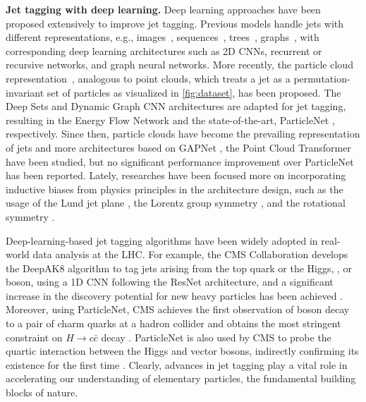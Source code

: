 \documentclass[nohyperref]{article}
\theoremstyle{plain}
\theoremstyle{definition}
\theoremstyle{remark}
\newcommand{\hcc}{\ensuremath{H\to c \bar{c}}\xspace}
\begin{document}
\textbf{Jet tagging with deep learning.}
Deep learning approaches have been proposed extensively to improve jet tagging. Previous models handle jets with different representations, e.g., images~\cite{deOliveira:2015xxd}, sequences~\cite{Guest:2016iqz}, trees~\cite{Louppe:2017ipp}, graphs~\cite{henrionneural}, with corresponding deep learning architectures such as 2D CNNs, recurrent or recursive networks, and graph neural networks. More recently, the particle cloud representation~\cite{Komiske:2018cqr,Qu:2019gqs}, analogous to point clouds, which treats a jet as a permutation-invariant set of particles as visualized in \cref{fig:dataset}, has been proposed. The Deep Sets \cite{NIPS2017_f22e4747} and Dynamic Graph CNN \cite{dgcnn} architectures are adapted for jet tagging, resulting in the Energy Flow Network \cite{Komiske:2018cqr} and the state-of-the-art, ParticleNet \cite{Qu:2019gqs}, respectively. Since then, particle clouds have become the prevailing representation of jets and more architectures based on GAPNet \cite{chen2019gapnet,Mikuni:2020wpr}, the Point Cloud Transformer \cite{guoPCTPointCloud2021,Mikuni:2021pou} have been studied, but no significant performance improvement over ParticleNet has been reported. Lately, researches have been focused more on incorporating inductive biases from physics principles in the architecture design, such as the usage of the Lund jet plane \cite{Dreyer:2018nbf,Dreyer:2020brq,Dreyer:2021hhr,Dreyer:2022yom}, the Lorentz group symmetry \cite{bogatskiy20a,Gong:2022lye}, and the rotational symmetry \cite{Shimmin:2021pkm,Dillon:2021gag}.

Deep-learning-based jet tagging algorithms have been widely adopted in real-world data analysis at the LHC. For example, the CMS Collaboration develops the DeepAK8 \cite{CMS:2020poo} algorithm to tag jets arising from the top quark or the Higgs, , or  boson, using a 1D CNN following the ResNet \cite{heDeepResidualLearning2015} architecture, and a significant increase in the discovery potential for new heavy particles has been achieved \cite{CMS:2021beq,CMS:2022lqh}. Moreover, using ParticleNet, CMS achieves the first observation of  boson decay to a pair of charm quarks at a hadron collider and obtains the most stringent constraint on \hcc decay \cite{CMS:2022psv}. ParticleNet is also used by CMS to probe the quartic interaction between the Higgs and vector bosons, indirectly confirming its existence for the first time \cite{CMS:2022nmn}. Clearly, advances in jet tagging play a vital role in accelerating our understanding of elementary particles, the fundamental building blocks of nature.
\end{document}
